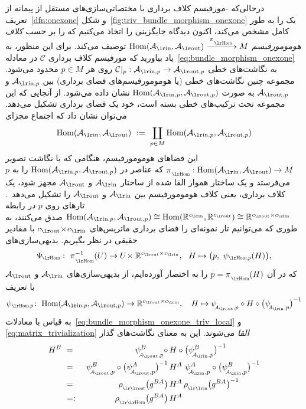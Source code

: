 درحالی‌که -مورفیسم کلاف برداری با مختصاتی‌سازی‌های مستقل از پیمانه از تعریف~\ref{dfn:onexone} و شکل~\ref{fig:triv_bundle_morphism_onexone} یک \onexoneGMfarsi را به طور کامل مشخص می‌کند، اکنون دیدگاه جایگزینی را اتخاذ می‌کنیم که \onexoneGMsfarsi را بر حسب \emph{کلاف هومومورفیسم} $\Hom(\Ain,\Aout) \xrightarrow{\,\piHom\,} M$ توصیف می‌کند.
برای این منظور، به یاد بیاورید که مورفیسم کلاف برداری $\mathcal{C}$ در معادله~\eqref{eq:bundle_morphism_onexone} به نگاشت‌های خطی ${\mathcal{C}\!\:|_p}: \Ainp\to\Aoutp$ روی هر $p\in M$ محدود می‌شود.
مجموعه چنین نگاشت‌های خطی (یا هومومورفیسم‌های فضای برداری) بین $\Ainp$ و $\Aoutp$ به صورت $\Hom(\Ainp,\Aoutp)$ نشان داده می‌شود.
از آنجایی که این مجموعه تحت ترکیب‌های خطی بسته است، خود یک فضای برداری تشکیل می‌دهد.
می‌توان نشان داد که اجتماع مجزای
\begin{align}
    \Hom(\Ain,\Aout)\ :=\ \coprod_{p\in M} \Hom(\Ainp,\Aoutp)
\end{align}
این فضاهای هومومورفیسم، هنگامی که با نگاشت تصویر $\piHom: \Hom(\Ain,\Aout) \to M$ که عناصر در $\Hom(\Ainp,\Aoutp)$ را به $p$ می‌فرستد و یک ساختار هموار القا شده از ساختار $\Ain$ و $\Aout$ مجهز شود، یک کلاف برداری، یعنی کلاف هومومورفیسم بین $\Ain$ و $\Aout$ را تشکیل می‌دهد~\cite{dundas2018differentialTopology}.
تارهای روی $p$ در رابطه $\Hom(\Ainp,\Aoutp) \cong \Hom(\R^\cin,\R^\cout) \cong \R^{\cout\times\cin}$ صدق می‌کنند، به طوری که می‌توانیم تار نمونه‌ای را فضای برداری ماتریس‌های ${\cout\!\times\!\cin}$ با مقادیر حقیقی در نظر بگیریم.
بدیهی‌سازی‌های
\begin{align}
    \PsiHom:\ \piHom^{-1}(U) \to U\!\times\R^{\cout\times\cin},\ \ H\mapsto \big(p,\ \psiHomp(H)\big) ,
\end{align}
که در آن $p=\piHom(H)$ را به اختصار آورده‌ایم، از بدیهی‌سازی‌های $\Ain$ و $\Aout$ با تعریف
\begin{align}\label{eq:Hom_bdl_triv_ptwise}
    \psiHomp\!:\ \Hom(\Ainp,\Aoutp) \to \R^{\cout\times\cin} ,\ \ \ H\mapsto \psiAoutp \circ H \circ \big(\psiAinp\big)^{-1}
\end{align}
به قیاس با معادلات~\eqref{eq:bundle_morphism_onexone_triv_local} و \eqref{eq:matrix_trivialization} \emph{القا} می‌شوند.
این به معنای نگاشت‌های گذار
\begin{alignat}{3}
    H^B
    \ &=&\ \psiAoutp^B \circ\,&H \circ \big(\psiAinp^B\big)^{-1} \notag \\
    \ &=&\ \psiAoutp^B \circ \big(\psiAoutp^A\big)^{-1}\,&H^A\ \psiAinp^A \circ \big(\psiAinp^B\big)^{-1} \notag \\
    \ &=&\ \rhoout\big(g^{BA}\big)\, &H^A\, \rhoin\big(g^{BA}\big)^{-1} \notag \\
    \ &=:&\ \rhoHom\big(g^{BA}\big)\, &H^A
\end{alignat}
